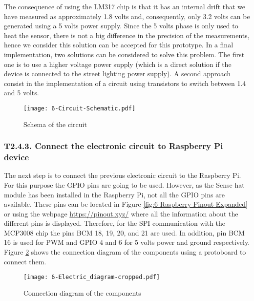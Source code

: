 The consequence of using the LM317 chip is that it has an internal drift that we have measured as approximately 1.8 volts and, consequently, only 3.2 volts can be generated using a 5 volts power supply. Since the 5 volts phase is only used to heat the sensor, there is not a big difference in the precision of the measurements, hence we consider this solution can be accepted for this prototype. In a final implementation, two solutions can be considered to solve this problem. The first one is to use a higher voltage power supply (which is a direct solution if the device is connected to the street lighting power supply). A second approach consist in the implementation of a circuit using transistors to switch between 1.4 and 5 volts.


\begin{figure}[!h]
	\begin{center}
		\texttt{[image: 6-Circuit-Schematic.pdf]}
		\caption{Schema of the circuit}
		\label{fig:6-Circuit-Schematic}
	\end{center}
\end{figure}




\subsubsection{T2.4.3. Connect the electronic circuit to Raspberry Pi device}
The next step is to connect the previous electronic circuit to the Raspberry Pi. For this purpose the GPIO pins are going to be used. However, as the Sense hat module has been installed in the Raspberry Pi, not all the GPIO pins are available. These pins can be located in Figure \ref{fig:6-Raspberry-Pinout-Expanded} or using the webpage \url{https://pinout.xyz/} where all the information about the different pins is displayed. Therefore, for the \ac{SPI} communication with the MCP3008 chip the pins BCM  18, 19, 20, and 21 are used. In addition, pin BCM 16 is used for \ac{PWM} and GPIO 4 and 6 for 5 volts power and ground respectively. Figure \ref{fig:6-Electric_diagram.pdf} shows the connection diagram of the components using a protoboard to connect them.

\begin{figure}[!h]
	\begin{center}
		\texttt{[image: 6-Electric\_diagram-cropped.pdf]}
		\caption{Connection diagram of the components}
		\label{fig:6-Electric_diagram.pdf}
	\end{center}
\end{figure}


